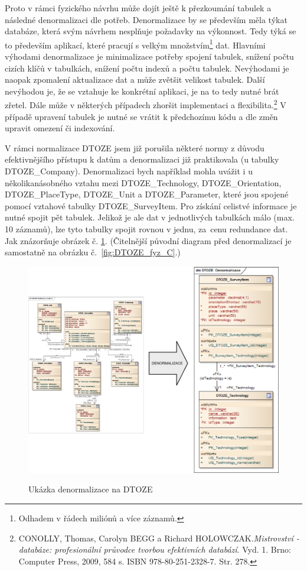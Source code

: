 \documentclass[11pt,a4paper]{article}
\begin{document}
Proto v rámci fyzického návrhu může dojít ještě k přezkoumání tabulek a následné denormalizaci dle potřeb. Denormalizace by se především měla týkat databáze, která svým návrhem nesplňuje požadavky na výkonnost. Tedy týká se to především aplikací, které pracují s velkým množstvím\footnote{Odhadem v řádech miliónů a více záznamů.} dat. Hlavními výhodami denormalizace je minimalizace potřeby spojení tabulek, snížení počtu cizích klíčů v tabulkách, snížení počtu indexů a počtu tabulek. Nevýhodami je naopak zpomalení aktualizace dat a může zvětšit velikost tabulek. Další nevýhodou je, že se vztahuje ke konkrétní aplikaci, je na to tedy nutné brát zřetel. Dále může v některých případech zhoršit implementaci a flexibilita.\footnote{CONOLLY, Thomas, Carolyn BEGG a Richard HOLOWCZAK.\textit{Mistrovství - databáze: profesionální průvodce tvorbou efektivních databází}. Vyd. 1. Brno: Computer Press, 2009, 584 s. ISBN 978-80-251-2328-7. Str. 278.} V případě upravení tabulek je nutné se vrátit k předchozímu kódu a dle změn upravit omezení či indexování.

V rámci normalizace DTOZE jsem již porušila některé normy z důvodu efektivnějšího přístupu k datům a denormalizaci již praktikovala (u tabulky DTOZE\_Company). Denormalizaci bych například mohla uvážit i u několikanásobného vztahu mezi DTOZE\_Technology, DTOZE\_Orientation, DTOZE\_PlaceType, DTOZE\_Unit a DTOZE\_Parameter, které jsou spojené pomocí vztahové tabulky DTOZE\_SurveyItem. Pro získání celistvé informace je nutné spojit pět tabulek. Jelikož je ale dat v jednotlivých tabulkách málo (max. 10 záznamů), lze tyto tabulky spojit rovnou v jednu, za~cenu redundance dat. Jak znázorňuje obrázek č. \ref{fig:DTOZE_fyz_CD_denormalizace}. (Čitelnější původní diagram před denormalizací je samostatně na obrázku č.~\ref{fig:DTOZE_fyz_C}.) 

\begin{figure}[H] 
\centering 
\caption{Ukázka denormalizace na DTOZE} 
\vspace{0.2cm}
\includegraphics[scale=0.55]{DTOZE_fyzCD_denormalizace_n} 
\label{fig:DTOZE_fyz_CD_denormalizace}
\end{figure} 
\end{document}
